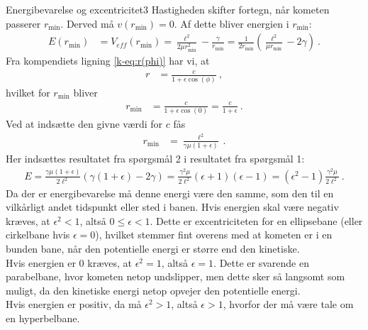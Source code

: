 %
%
\begin{opgave}{Energibevarelse og excentricitet}{3}
\opg Hastigheden skifter fortegn, når kometen passerer $r_{\mathrm{min}}$. Derved må $v(r_{\mathrm{min}}) = 0$. Af dette bliver energien i $r_{\mathrm{min}}$:
\begin{align*}
	E(r_{\mathrm{min}}) &= V_{eff}(r_{\mathrm{min}})
	= \frac{\ell^2}{2\mu r_{\mathrm{min}}^2} - \frac{\gamma}{r_{\mathrm{min}}}
	= \frac{1}{2 r_{\mathrm{min}}} \left(\frac{\ell^2}{\mu r_{\mathrm{min}}} - 2\gamma\right) \: .
\end{align*}
%
\opg Fra kompendiets ligning \eqref{k-eq:r(phi)} har vi, at
\begin{align*}
	r &= \frac{c}{1+\epsilon\cos(\phi)} \: ,
\end{align*}
hvilket for $r_{\mathrm{min}}$ bliver
\begin{align*}
	r_{\mathrm{min}} &= \frac{c}{1+\epsilon\cos(0)}
	= \frac{c}{1+\epsilon} \: .
\end{align*}
Ved at indsætte den givne værdi for $c$ fås
\begin{align*}
	r_{\mathrm{min}} &= \frac{\ell^2}{\gamma\mu(1+\epsilon)} \: .
\end{align*}
%
\opg Her indsættes resultatet fra spørgsmål 2 i resultatet fra spørgsmål 1:
\begin{align*}
	E = \frac{\gamma\mu(1+\epsilon)}{2 \ell^2} \left(\gamma(1+\epsilon) - 2\gamma\right)
	= \frac{\gamma^2\mu}{2\ell^2} (\epsilon+1)(\epsilon-1)
	= (\epsilon^2-1)\frac{\gamma^2\mu}{2\ell^2} \: .
\end{align*}
Da der er energibevarelse må denne energi være den samme, som den til en vilkårligt andet tidspunkt eller sted i banen.
%
\opg Hvis energien skal være negativ kræves, at $\epsilon^2 < 1$, altså $0\leq \epsilon < 1$. Dette er excentriciteten for en ellipsebane (eller cirkelbane hvis $\epsilon = 0$), hvilket stemmer fint overens med at kometen er i en bunden bane, når den potentielle energi er større end den kinetiske.\\
Hvis energien er $0$ kræves, at $\epsilon^2 = 1$, altså $\epsilon = 1$. Dette er svarende en parabelbane, hvor kometen netop undslipper, men dette sker så langsomt som muligt, da den kinetiske energi netop opvejer den potentielle energi.\\
Hvis energien er positiv, da må $\epsilon^2 > 1$, altså $\epsilon > 1$, hvorfor der må være tale om en hyperbelbane.
\end{opgave}
%
%
%
